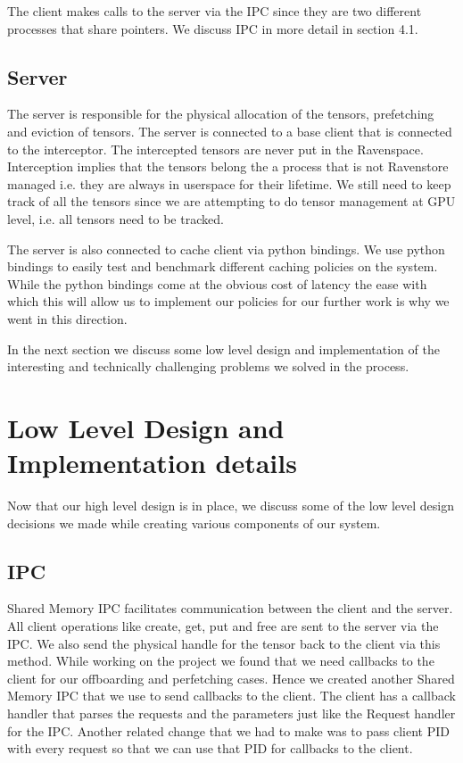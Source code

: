 \documentclass{article}
\begin{document}
The client makes calls to the server via the IPC since they are two different processes that share pointers. We discuss IPC in more detail in section 4.1.

\subsection{Server}
The server is responsible for the physical allocation of the tensors, prefetching and eviction of tensors.
The server is connected to a base client that is connected to the interceptor. The intercepted tensors are
never put in the Ravenspace. Interception implies that the tensors belong the a process that is not Ravenstore managed i.e.
they are always in userspace for their lifetime.
We still need to keep track of all the tensors since we are attempting to do tensor management at GPU level, i.e. all tensors
need to be tracked.

The server is also connected to cache client via python bindings. We use python bindings to easily test and benchmark different
caching policies on the system. While the python bindings come at the obvious cost of latency the ease with which this will allow us 
to implement our policies for our further work is why we went in this direction.

In the next section we discuss some low level design and implementation
of the interesting and technically challenging problems we solved in the process.


\section{Low Level Design and Implementation details}


Now that our high level design is in place, we discuss some of the low level design decisions we made
while creating various components of our system.

\subsection{IPC}
Shared Memory IPC facilitates communication between the client and the server. All client operations like
create, get, put and free are sent to the server via the IPC. We also send the physical handle for the 
tensor back to the client via this method. While working on the project we found that we need
callbacks to the client for our offboarding and perfetching cases. Hence we created another Shared Memory IPC 
that we use to send callbacks to the client. The client has a callback handler that parses the requests and the 
parameters just like the Request handler for the IPC. Another related change that we had to make was to pass
client PID with every request so that we can use that PID for callbacks to the client.
\end{document}
